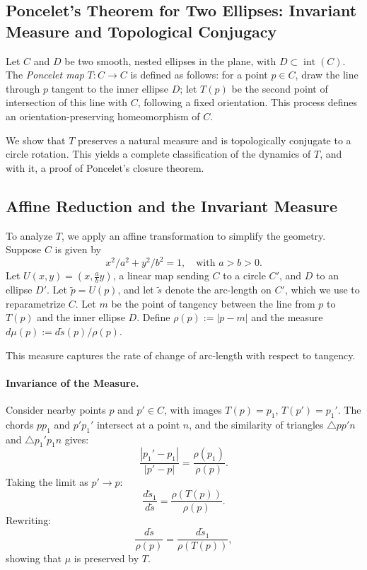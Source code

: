 \begin{technical}
  \section*{Poncelet’s Theorem for Two Ellipses: Invariant Measure and Topological Conjugacy}
  
  Let \( C \) and \( D \) be two smooth, nested ellipses in the plane, with \( D \subset \operatorname{int}(C) \). The \emph{Poncelet map} \( T: C \to C \) is defined as follows: for a point \( p \in C \), draw the line through \( p \) tangent to the inner ellipse \( D \); let \( T(p) \) be the second point of intersection of this line with \( C \), following a fixed orientation. This process defines an orientation-preserving homeomorphism of \( C \).
  
  We show that \( T \) preserves a natural measure and is topologically conjugate to a circle rotation. This yields a complete classification of the dynamics of \( T \), and with it, a proof of Poncelet's closure theorem.
  
  \subsection*{Affine Reduction and the Invariant Measure}
  
  To analyze \( T \), we apply an affine transformation to simplify the geometry. Suppose \( C \) is given by
  \[
  {x^2}/{a^2} + {y^2}/{b^2} = 1, \quad \text{with } a > b > 0.
  \]
  Let \( U(x, y) = (x, \frac{a}{b} y) \), a linear map sending \( C \) to a circle \( C' \), and \( D \) to an ellipse \( D' \). Let \( \tilde{p} = U(p) \), and let \( \tilde{s} \) denote the arc-length on \( C' \), which we use to reparametrize \( C \). Let \( m \) be the point of tangency between the line from \( p \) to \( T(p) \) and the inner ellipse \( D \). Define $\rho(p) := |p - m|$ and the measure $d\mu(p) := {d\tilde{s}(p)}/{\rho(p)}$.
  
  This measure captures the rate of change of arc-length with respect to tangency.
  
  \paragraph{Invariance of the Measure.} Consider nearby points \( p \) and \( p' \in C \), with images \( T(p) = p_1 \), \( T(p') = p_1' \). The chords \( pp_1 \) and \( p'p_1' \) intersect at a point \( n \), and the similarity of triangles \( \triangle pp'n \) and \( \triangle p_1'p_1n \) gives:
  \[
  \frac{|p_1' - p_1|}{|p' - p|} = \frac{\rho(p_1)}{\rho(p)}.
  \]
  Taking the limit as \( p' \to p \):
  \[
  \frac{d\tilde{s}_1}{d\tilde{s}} = \frac{\rho(T(p))}{\rho(p)}.
  \]
  Rewriting:
  \[
  \frac{d\tilde{s}}{\rho(p)} = \frac{d\tilde{s}_1}{\rho(T(p))},
  \]
  showing that \( \mu \) is preserved by \( T \).
  

\end{technical}
